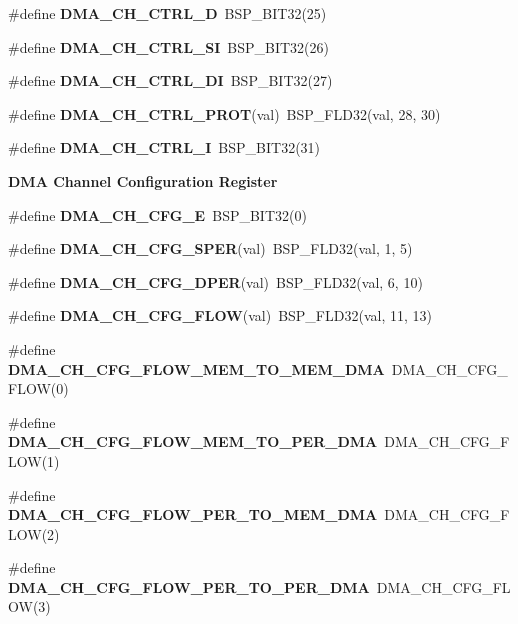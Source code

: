 \begin{Indent}
\begin{DoxyCompactItemize}
\#define {\bfseries D\+M\+A\+\_\+\+C\+H\+\_\+\+C\+T\+R\+L\+\_\+D}~B\+S\+P\+\_\+\+B\+I\+T32(25)
\item 
\#define {\bfseries D\+M\+A\+\_\+\+C\+H\+\_\+\+C\+T\+R\+L\+\_\+\+SI}~B\+S\+P\+\_\+\+B\+I\+T32(26)
\item 
\#define {\bfseries D\+M\+A\+\_\+\+C\+H\+\_\+\+C\+T\+R\+L\+\_\+\+DI}~B\+S\+P\+\_\+\+B\+I\+T32(27)
\item 
\#define {\bfseries D\+M\+A\+\_\+\+C\+H\+\_\+\+C\+T\+R\+L\+\_\+\+P\+R\+OT}(val)~B\+S\+P\+\_\+\+F\+L\+D32(val, 28, 30)
\item 
\#define {\bfseries D\+M\+A\+\_\+\+C\+H\+\_\+\+C\+T\+R\+L\+\_\+I}~B\+S\+P\+\_\+\+B\+I\+T32(31)
\end{DoxyCompactItemize}
\end{Indent}
\begin{Indent}\textbf{ D\+MA Channel Configuration Register}\par
\begin{DoxyCompactItemize}
\item 
\#define {\bfseries D\+M\+A\+\_\+\+C\+H\+\_\+\+C\+F\+G\+\_\+E}~B\+S\+P\+\_\+\+B\+I\+T32(0)
\item 
\#define {\bfseries D\+M\+A\+\_\+\+C\+H\+\_\+\+C\+F\+G\+\_\+\+S\+P\+ER}(val)~B\+S\+P\+\_\+\+F\+L\+D32(val, 1, 5)
\item 
\#define {\bfseries D\+M\+A\+\_\+\+C\+H\+\_\+\+C\+F\+G\+\_\+\+D\+P\+ER}(val)~B\+S\+P\+\_\+\+F\+L\+D32(val, 6, 10)
\item 
\#define {\bfseries D\+M\+A\+\_\+\+C\+H\+\_\+\+C\+F\+G\+\_\+\+F\+L\+OW}(val)~B\+S\+P\+\_\+\+F\+L\+D32(val, 11, 13)
\item 
\#define {\bfseries D\+M\+A\+\_\+\+C\+H\+\_\+\+C\+F\+G\+\_\+\+F\+L\+O\+W\+\_\+\+M\+E\+M\+\_\+\+T\+O\+\_\+\+M\+E\+M\+\_\+\+D\+MA}~D\+M\+A\+\_\+\+C\+H\+\_\+\+C\+F\+G\+\_\+\+F\+L\+OW(0)
\item 
\#define {\bfseries D\+M\+A\+\_\+\+C\+H\+\_\+\+C\+F\+G\+\_\+\+F\+L\+O\+W\+\_\+\+M\+E\+M\+\_\+\+T\+O\+\_\+\+P\+E\+R\+\_\+\+D\+MA}~D\+M\+A\+\_\+\+C\+H\+\_\+\+C\+F\+G\+\_\+\+F\+L\+OW(1)
\item 
\#define {\bfseries D\+M\+A\+\_\+\+C\+H\+\_\+\+C\+F\+G\+\_\+\+F\+L\+O\+W\+\_\+\+P\+E\+R\+\_\+\+T\+O\+\_\+\+M\+E\+M\+\_\+\+D\+MA}~D\+M\+A\+\_\+\+C\+H\+\_\+\+C\+F\+G\+\_\+\+F\+L\+OW(2)
\item 
\#define {\bfseries D\+M\+A\+\_\+\+C\+H\+\_\+\+C\+F\+G\+\_\+\+F\+L\+O\+W\+\_\+\+P\+E\+R\+\_\+\+T\+O\+\_\+\+P\+E\+R\+\_\+\+D\+MA}~D\+M\+A\+\_\+\+C\+H\+\_\+\+C\+F\+G\+\_\+\+F\+L\+OW(3)
\item 

\end{DoxyCompactItemize}
\end{Indent}
